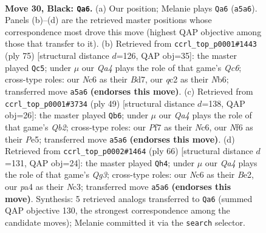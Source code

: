 \documentclass[11pt]{article}
\begin{document}
\clearpage

\begin{figure}[p]\centering
\begin{subfigure}{0.46\textwidth}\centering
\resizebox{\linewidth}{!}{%
\newchessgame
\chessboard[
  setfen={4rk2/Pb2rp2/1pn2n2/qN1p1BNP/P2P2p1/6R1/2Q2K2/7R b - - 0 30},
  showmover=false,
  pgfstyle=straightmove, color=movearrow, markmove={a5-a6}
]}
\caption{}
\end{subfigure}\hfill
\begin{subfigure}{0.46\textwidth}\centering
\resizebox{\linewidth}{!}{%
\newchessgame
\chessboard[
  setfen={r1r3k1/3b1p2/1n4p1/1P1p3p/p2N3P/2q1P1P1/R3BP1K/1R1Q4 b - - 25 38},
  showmover=false,
  pgfstyle=straightmove, color=movearrow, markmove={c3-c5}
]}
\caption{}
\end{subfigure}
\\[4pt]
\begin{subfigure}{0.46\textwidth}\centering
\resizebox{\linewidth}{!}{%
\newchessgame
\chessboard[
  setfen={1r1rk3/1q2bp2/2n2n1Q/1N1ppP2/p3P3/P6P/NPP5/2KR1BR1 b - - 0 25},
  showmover=false,
  pgfstyle=straightmove, color=movearrow, markmove={b7-b6}
]}
\caption{}
\end{subfigure}\hfill
\begin{subfigure}{0.46\textwidth}\centering
\resizebox{\linewidth}{!}{%
\newchessgame
\chessboard[
  setfen={4br2/ppq4k/2p1n2P/3p2r1/3Pp1P1/P1N3Q1/1PP1B3/1K1R3R w - - 1 34},
  showmover=false,
  pgfstyle=straightmove, color=movearrow, markmove={g3-h4}
]}
\caption{}
\end{subfigure}
\caption{\textbf{Move 30, Black: \texttt{Qa6}.} (a) Our position; Melanie plays \texttt{Qa6} (\texttt{a5a6}). Panels (b)--(d) are the retrieved master positions whose correspondence most drove this move (highest QAP objective among those that transfer to it). (b) Retrieved from \texttt{ccrl\_top\_p0001\#1443} (ply 75) [structural distance $d$=126, QAP obj=35]: the master played \texttt{Qc5}; under $\mu$ our \emph{Qa4} plays the role of that game's \emph{Qc6}; cross-type roles: our \emph{N}c6 as their \emph{B}d7, our \emph{q}c2 as their \emph{N}b6; transferred move \texttt{a5a6} \textbf{(endorses this move)}. (c) Retrieved from \texttt{ccrl\_top\_p0001\#3734} (ply 49) [structural distance $d$=138, QAP obj=26]: the master played \texttt{Qb6}; under $\mu$ our \emph{Qa4} plays the role of that game's \emph{Qb2}; cross-type roles: our \emph{P}f7 as their \emph{N}c6, our \emph{N}f6 as their \emph{P}e5; transferred move \texttt{a5a6} \textbf{(endorses this move)}. (d) Retrieved from \texttt{ccrl\_top\_p0002\#1464} (ply 66) [structural distance $d$=131, QAP obj=24]: the master played \texttt{Qh4}; under $\mu$ our \emph{Qa4} plays the role of that game's \emph{Qg3}; cross-type roles: our \emph{N}c6 as their \emph{B}e2, our \emph{p}a4 as their \emph{N}c3; transferred move \texttt{a5a6} \textbf{(endorses this move)}. Synthesis: 5 retrieved analogs transferred to \texttt{Qa6} (summed QAP objective 130, the strongest correspondence among the candidate moves); Melanie committed it via the \texttt{search} selector.}
\label{fig:thought-m59}
\end{figure}
\end{document}
